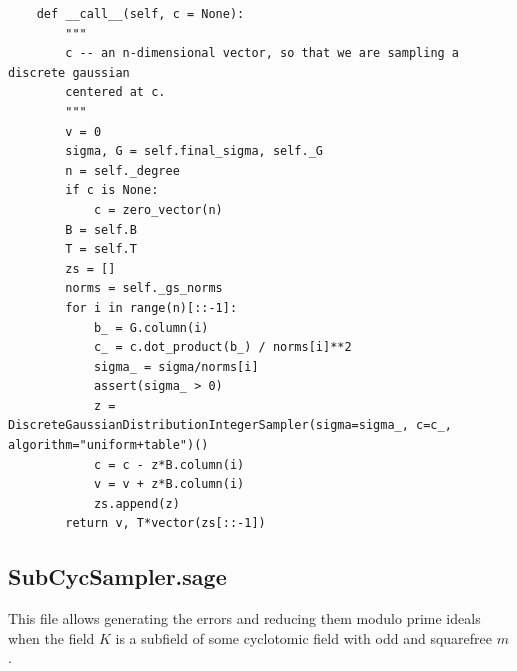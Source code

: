 \documentclass[envcountsame]{llncs}
\begin{document}
\begin{verbatim}
    def __call__(self, c = None):
        """
        c -- an n-dimensional vector, so that we are sampling a discrete gaussian
        centered at c.
        """
        v = 0
        sigma, G = self.final_sigma, self._G
        n = self._degree
        if c is None:
            c = zero_vector(n)
        B = self.B
        T = self.T
        zs = []
        norms = self._gs_norms
        for i in range(n)[::-1]:
            b_ = G.column(i)
            c_ = c.dot_product(b_) / norms[i]**2
            sigma_ = sigma/norms[i]
            assert(sigma_ > 0)
            z = DiscreteGaussianDistributionIntegerSampler(sigma=sigma_, c=c_, algorithm="uniform+table")()
            c = c - z*B.column(i)
            v = v + z*B.column(i)
            zs.append(z)
        return v, T*vector(zs[::-1])
\end{verbatim}

\subsection{SubCycSampler.sage}

\normalsize This file allows generating the errors and reducing them modulo prime ideals when the field $K$ is a subfield of some cyclotomic field with 
odd and squarefree $m$. 
\end{document}
